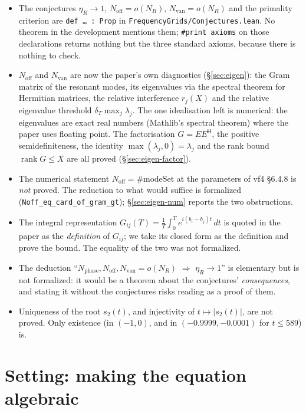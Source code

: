 \documentclass[11pt,a4paper]{article}
\newcommand{\lb}{\_\allowbreak}
\newcommand{\code}[1]{\texttt{#1}}
\newcommand{\itemization}[1]{\begin{itemize}[leftmargin=1.4em,itemsep=1pt,topsep=2pt]#1\end{itemize}}
\theoremstyle{definition}
\theoremstyle{remark}
\begin{document}
\itemization{
\item The conjectures $\eta_R\to1$, $N_{\mathrm{off}}=o(N_R)$,
  $N_{\mathrm{van}}=o(N_R)$ and the primality criterion are \code{def \dots{} : Prop} in
  \code{FrequencyGrids/Conjectures.lean}.  No theorem in the development mentions them;
  \code{\#print axioms} on those declarations returns nothing but the three standard
  axioms, because there is nothing to check.
\item $N_{\mathrm{off}}$ and $N_{\mathrm{van}}$ are now the paper's own diagnostics
  (\S\ref{sec:eigen}): the Gram matrix of the resonant modes, its eigenvalues via the
  spectral theorem for Hermitian matrices, the relative interference $r_j(X)$ and the
  relative eigenvalue threshold $\delta_T\max_j\lambda_j$.  The one idealisation left is
  numerical: the eigenvalues are exact real numbers (Mathlib's spectral theorem) where the
  paper uses floating point.  The factorisation $G=EE^{\mathsf H}$, the positive
  semidefiniteness, the identity $\max(\lambda_j,0)=\lambda_j$ and the rank bound
  $\operatorname{rank}G\le X$ are all proved (\S\ref{sec:eigen-factor}).
\item The numerical statement $N_{\mathrm{off}}=\#\mathrm{modeSet}$ at the parameters of
  vf4 \S6.4.8 is \emph{not} proved.  The reduction to what would suffice is formalized
  (\code{Noff\lb eq\lb card\lb of\lb gram\lb gt}); \S\ref{sec:eigen-num} reports the two
  obstructions.
\item The integral representation $G_{ij}(T)=\frac1T\int_0^Te^{i(b_i-b_j)t}\,dt$ is quoted in
  the paper as the \emph{definition} of $G_{ij}$; we take its closed form as the definition
  and prove the bound.  The equality of the two was not formalized.
\item The deduction ``$N_{\mathrm{phase}},N_{\mathrm{off}},N_{\mathrm{van}}=o(N_R)$
  $\Rightarrow$ $\eta_R\to1$'' is elementary but is not formalized: it would be a theorem
  about the conjectures' \emph{consequences}, and stating it without the conjectures risks
  reading as a proof of them.
\item Uniqueness of the root $s_2(t)$, and injectivity of $t\mapsto|s_2(t)|$, are not
  proved.  Only existence (in $(-1,0)$, and in $(-0.9999,-0.0001)$ for $t\le589$) is.
}

\section{Setting: making the equation algebraic}\label{sec:setup}
\end{document}
